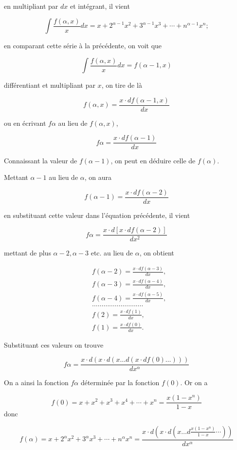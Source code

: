 \documentclass{article}
\begin{document}
en multipliant par \(d x\) et intégrant, il vient

\[
\int \frac{f(\alpha, x)}{x} d x=x+2^{\alpha-1} x^{2}+3^{\alpha-1} x^{3}+\cdots+n^{\alpha-1} x^{n} ;
\]

en comparant cette série à la précédente, on voit que

\[
\int \frac{f(\alpha, x)}{x} d x=f(\alpha-1, x)
\]

différentiant et multipliant par \(x\), on tire de là

\[
f(\alpha, x)=\frac{x \cdot d f(\alpha-1, x)}{d x}
\]

ou en écrivant \(f \alpha\) au lieu de \(f(\alpha, x)\),

\[
f \alpha=\frac{x \cdot d f(\alpha-1)}{d x}
\]

Connaissant la valeur de \(f(\alpha-1)\), on peut en déduire celle de \(f(\alpha)\).

Mettant \(\alpha-1\) au lieu de \(\alpha\), on aura

\[
f(\alpha-1)=\frac{x \cdot d f(\alpha-2)}{d x}
\]

en substituant cette valeur dans l'équation précédente, il vient

\[
f \alpha=\frac{x \cdot d[x \cdot d f(\alpha-2)]}{d x^{2}}
\]

mettant de plus \(\alpha-2, \alpha-3\) etc. au lieu de \(\alpha\), on obtient

\[
\begin{aligned}
& f(\alpha-2)=\frac{x \cdot d f(\alpha-3)}{d x}, \\
& f(\alpha-3)=\frac{x \cdot d f(\alpha-4)}{d x}, \\
& f(\alpha-4)=\frac{x \cdot d f(\alpha-5)}{d x}, \\
& \ldots \ldots \ldots \ldots \ldots \ldots . \ldots . \ldots . \\
& f(2)=\frac{x \cdot d f(1)}{d x}, \\
& f(1)=\frac{x \cdot d f(0)}{d x} .
\end{aligned}
\]

Substituant ces valeurs on trouve

\[
f \alpha=\frac{x \cdot d(x \cdot d(x \ldots d(x \cdot d f(0) \ldots)))}{d x^{\alpha}}
\]

On a ainsi la fonction \(f \alpha\) déterminée par la fonction \(f(0)\). Or on a

\[
f(0)=x+x^{2}+x^{3}+x^{4}+\cdots+x^{n}=\frac{x\left(1-x^{n}\right)}{1-x}
\]
donc

\[
f(\alpha)=x+2^{\alpha} x^{2}+3^{\alpha} x^{3}+\cdots+n^{\alpha} x^{n}=\frac{x \cdot d\left(x \cdot d\left(x \ldots d \frac{x\left(1-x^{n}\right)}{1-x} \cdots\right)\right)}{d x^{\alpha}}
\]
\end{document}
